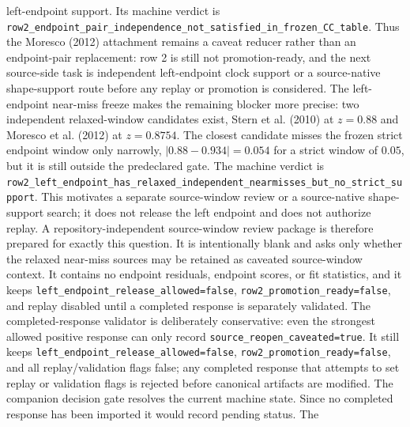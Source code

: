 \documentclass[11pt]{article}
\begin{document}
left-endpoint support.  Its machine verdict is
\texttt{row2\_\allowbreak{}endpoint\_\allowbreak{}pair\_\allowbreak{}independence\_\allowbreak{}not\_\allowbreak{}satisfied\_\allowbreak{}in\_\allowbreak{}frozen\_\allowbreak{}CC\_\allowbreak{}table}.
Thus the Moresco (2012) attachment remains a caveat reducer rather than an
endpoint-pair replacement: row 2 is still not promotion-ready, and the next
source-side task is independent left-endpoint clock support or a source-native
shape-support route before any replay or promotion is considered.
The left-endpoint near-miss freeze makes the remaining blocker more precise:
two independent relaxed-window candidates exist, Stern et al. (2010) at
\(z=0.88\) and Moresco et al. (2012) at \(z=0.8754\).  The closest candidate
misses the frozen strict endpoint window only narrowly,
\(|0.88-0.934|=0.054\) for a strict window of \(0.05\), but it is still outside
the predeclared gate.  The machine verdict is
\texttt{row2\_\allowbreak{}left\_\allowbreak{}endpoint\_\allowbreak{}has\_\allowbreak{}relaxed\_\allowbreak{}independent\_\allowbreak{}nearmisses\_\allowbreak{}but\_\allowbreak{}no\_\allowbreak{}strict\_\allowbreak{}support}.
This motivates a separate source-window review or a source-native shape-support
search; it does not release the left endpoint and does not authorize replay.
A repository-independent source-window review package is therefore prepared for
exactly this question.  It is intentionally blank and asks only whether the
relaxed near-miss sources may be retained as caveated source-window context.  It
contains no endpoint residuals, endpoint scores, or fit statistics, and it keeps
\texttt{left\_\allowbreak{}endpoint\_\allowbreak{}release\_\allowbreak{}allowed=\allowbreak{}false},
\texttt{row2\_\allowbreak{}promotion\_\allowbreak{}ready=\allowbreak{}false}, and replay disabled until a completed
response is separately validated.
The completed-response validator is deliberately conservative: even the
strongest allowed positive response can only record
\texttt{source\_\allowbreak{}reopen\_\allowbreak{}caveated=\allowbreak{}true}.  It still keeps
\texttt{left\_\allowbreak{}endpoint\_\allowbreak{}release\_\allowbreak{}allowed=\allowbreak{}false},
\texttt{row2\_\allowbreak{}promotion\_\allowbreak{}ready=\allowbreak{}false}, and all replay/validation flags false;
any completed response that attempts to set replay or validation flags is
rejected before canonical artifacts are modified.
The companion decision gate resolves the current machine state.  Since no
completed response has been imported it would record pending status.  The
\end{document}
